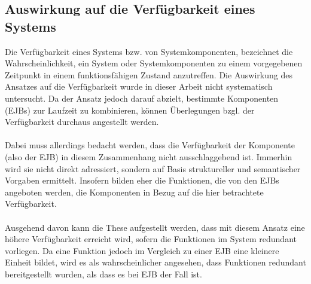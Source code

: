 \subsection{Auswirkung auf die Verfügbarkeit eines Systems}\label{sec_stabliliy}
Die Verfügbarkeit eines Systems bzw. von Systemkomponenten, bezeichnet die Wahrscheinlichkeit, ein System oder Systemkomponenten zu einem vorgegebenen Zeitpunkt in einem funktionsfähigen Zustand anzutreffen. \cite{it-admin}
Die Auswirkung des Ansatzes auf die Verfügbarkeit wurde in dieser Arbeit nicht systematisch untersucht. Da der Ansatz jedoch darauf abzielt, bestimmte Komponenten (EJBs) zur Laufzeit zu kombinieren, können Überlegungen bzgl. der Verfügbarkeit durchaus angestellt werden.
\\\\
Dabei muss allerdings bedacht werden, dass die Verfügbarkeit der Komponente (also der EJB) in diesem Zusammenhang nicht ausschlaggebend ist. Immerhin wird sie nicht direkt adressiert, sondern auf Basis struktureller und semantischer Vorgaben ermittelt. Insofern bilden eher die Funktionen, die von den EJBs angeboten werden, die Komponenten in Bezug auf die hier betrachtete Verfügbarkeit.
\\\\
Ausgehend davon kann die These aufgestellt werden, dass mit diesem Ansatz eine höhere Verfügbarkeit erreicht wird, sofern die Funktionen im System redundant vorliegen. Da eine Funktion jedoch im Vergleich zu einer EJB eine kleinere Einheit bildet, wird es als wahrscheinlicher angesehen, dass Funktionen redundant bereitgestellt wurden, als dass es bei EJB der Fall ist.
